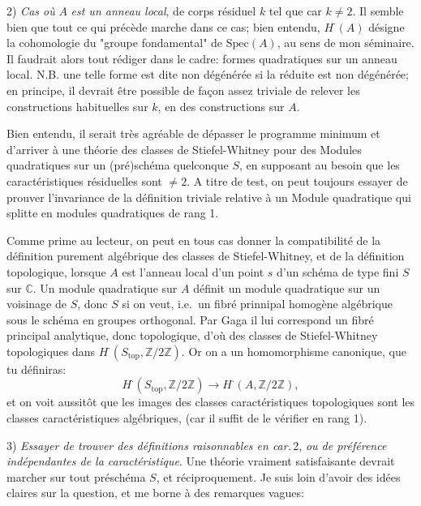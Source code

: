 \documentclass[11pt,a4paper]{article}
\begin{document}
2) \emph{Cas où} $A$ \emph{est un anneau local}, de corps résiduel $k$ tel
que car $k \neq 2$. Il semble bien que tout ce qui précède marche dans ce
cas; bien entendu, $H^{\cdot}(A)$ désigne la cohomologie du "groupe
fondamental" de $\mathrm{Spec}(A)$, au sens de mon séminaire. Il faudrait
alors tout rédiger dans le cadre: formes quadratiques sur un anneau local.
N.B. une telle forme est dite non dégénérée si la réduite est non
dégénérée; en principe, il devrait être possible de façon assez triviale
de relever les constructions habituelles sur $k$, en des constructions
sur $A$.

Bien entendu, il serait très agréable de dépasser le programme minimum et
d'arriver à une théorie des classes de Stiefel-Whitney pour des Modules
quadratiques sur un (pré)schéma quelconque $S$, en supposant au besoin que
les caractéristiques résiduelles sont $\neq 2$. A titre de test, on peut
toujours essayer de prouver l'invariance de la définition triviale
relative à un Module quadratique qui splitte en modules quadratiques de
rang 1.

Comme prime au lecteur, on peut en tous cas donner la compatibilité de la
définition purement algébrique des classes de Stiefel-Whitney, et de la
définition topologique, lorsque $A$ est l'anneau local d'un point $s$ d'un
schéma de type fini $S$ sur $\mathbb{C}$. Un module quadratique sur $A$
définit un module quadratique sur un voisinage de $S$, donc $S$ si on veut,
i.e.\ un fibré prinnipal homogène algébrique sous le schéma en groupes
orthogonal. Par Gaga il lui correspond un fibré principal analytique, donc
topologique, d'où des classes de Stiefel-Whitney topologiques dans
$H^{\cdot}(S_{\mathrm{top}}, \mathbb{Z}/2\mathbb{Z})$. Or on a un
homomorphisme canonique, que tu définiras:
\[
H^{\cdot}(S_{\mathrm{top}}, \mathbb{Z}/2\mathbb{Z}) \to H^{\cdot}(A,
\mathbb{Z}/2\mathbb{Z}) ,
\]
et on voit aussitôt que les images des classes caractéristiques
topologiques sont les classes caractéristiques algébriques, (car il suffit
de le vérifier en rang 1).


3) \emph{Essayer de trouver des définitions raisonnables en car.}\,2,
\emph{ou de préférence indépendantes de la caractéristique}. Une théorie
vraiment satisfaisante devrait marcher sur tout préschéma $S$, et
réciproquement. Je suis loin d'avoir des idées claires sur la question, et
me borne à des remarques vagues:
\end{document}
